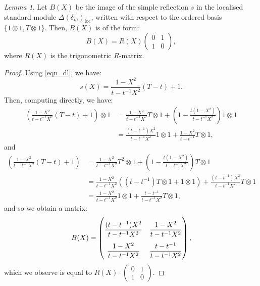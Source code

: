 \documentclass[a4paper]{report}
\theoremstyle{theorem}
\theoremstyle{definition}
\theoremstyle{remark}
\theoremstyle{proposition}
\theoremstyle{conjecture}
\theoremstyle{lemma}
\newtheorem{lemma}{Lemma}
\theoremstyle{corollary}
\theoremstyle{exercise}
\theoremstyle{example}
\newcommand{\on}{\operatorname}
\begin{document}
  \begin{lemma}\label{lem_s_qkz}
      Let $B(X)$ be the image of the simple reflection $s$ in the localised standard module
      $\Delta(\delta_m)_{\on{loc}}$, written with respect to the ordered basis 
      $\lbrace 1\otimes 1, T\otimes 1\rbrace$. Then, $B(X)$ is of the form:
      $$B(X) = R(X)\begin{pmatrix}
          0 & 1\\
          1 & 0
      \end{pmatrix},$$
      where $R(X)$ is the trigonometric $R$-matrix.
  \end{lemma}
  \begin{proof}
      Using \eqref{eqn_dl}, we have: 
      \begin{equation}\label{eqn_s}
          s(X) = 
          \frac{1-X^2}{t-t^{-1}X^2}(T-t) + 1.
      \end{equation}
      Then, computing directly, we have:
      \begin{align*}
          \left(\frac{1-X^2}{t-t^{-1}X^2}(T-t) + 1\right) \otimes 1 &= \frac{1-X^2}{t-t^{-1}X^2} T\otimes 1 + \left(1- \frac{t(1-X^2)}{t-t^{-1}X^2}\right)1\otimes 1\\
          &= \frac{(t-t^{-1})X^2}{t-t^{-1}X^2} 1\otimes 1 + \frac{1-X^2}{t-t^{-1}} T\otimes 1,
      \end{align*}
      and \begin{align*}
          \left(\frac{1-X^2}{t-t^{-1}X^2}(T-t) + 1\right) &= \frac{1-X^2}{t-t^{-1}X^2} T^2 \otimes 1 +\left(1 - \frac{t(1-X^2)}{t-t^{-1}X^2}\right)T\otimes 1\\
          &= \frac{1-X^2}{t-t^{-1}X^2} ((t-t^{-1})T \otimes 1 + 1\otimes 1) + \frac{(t-t^{-1})X^2}{t-t^{-1}X^2} T\otimes 1\\
          &= \frac{1-X^2}{t-t^{-1}X^2} 1\otimes 1 + \frac{t-t^{-1}}{t-t^{-1}X^2} T\otimes 1,
      \end{align*}
      and so we obtain a matrix:
      \begin{equation}
          B(X) = \renewcommand\arraystretch{2.5}\begin{pmatrix}
              \displaystyle\frac{(t-t^{-1})X^2}{t-t^{-1}X^2} & \displaystyle\frac{1-X^2}{t-t^{-1}X^2}\\
              \displaystyle\frac{1-X^2}{t-t^{-1}X^2} & \displaystyle\frac{t-t^{-1}}{t-t^{-1}X^2}
          \end{pmatrix},
      \end{equation}
      which we observe is equal to $R(X) \cdot \begin{pmatrix}
          0 & 1\\
          1 & 0
      \end{pmatrix}$.
  \end{proof}
\end{document}
